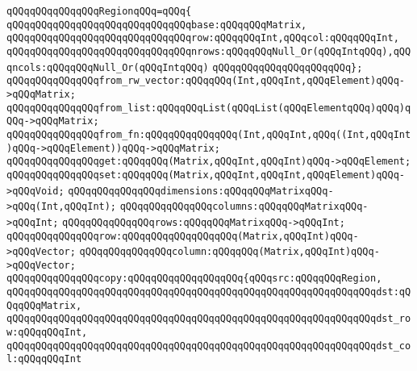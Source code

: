 \verb|qQQqqQQqqQQqqQQqRegionqQQq=qQQq{|\newline
\verb|qQQqqQQqqQQqqQQqqQQqqQQqqQQqqQQqbase:qQQqqQQqMatrix,|\newline
\verb|qQQqqQQqqQQqqQQqqQQqqQQqqQQqqQQqrow:qQQqqQQqInt,qQQqcol:qQQqqQQqInt,|\newline
\verb|qQQqqQQqqQQqqQQqqQQqqQQqqQQqqQQqnrows:qQQqqQQqNull_Or(qQQqIntqQQq),qQQqncols:qQQqqQQqNull_Or(qQQqIntqQQq)|\newline
\verb|qQQqqQQqqQQqqQQqqQQqqQQq};|\newline
\newline
\verb|qQQqqQQqqQQqqQQqfrom_rw_vector:qQQqqQQq(Int,qQQqInt,qQQqElement)qQQq->qQQqMatrix;|\newline
\verb|qQQqqQQqqQQqqQQqfrom_list:qQQqqQQqList(qQQqList(qQQqElementqQQq)qQQq)qQQq->qQQqMatrix;|\newline
\verb|qQQqqQQqqQQqqQQqfrom_fn:qQQqqQQqqQQqqQQq(Int,qQQqInt,qQQq((Int,qQQqInt)qQQq->qQQqElement))qQQq->qQQqMatrix;|\newline
\newline
\verb|qQQqqQQqqQQqqQQqget:qQQqqQQq(Matrix,qQQqInt,qQQqInt)qQQq->qQQqElement;|\newline
\verb|qQQqqQQqqQQqqQQqset:qQQqqQQq(Matrix,qQQqInt,qQQqInt,qQQqElement)qQQq->qQQqVoid;|\newline
\newline
\verb|qQQqqQQqqQQqqQQqdimensions:qQQqqQQqMatrixqQQq->qQQq(Int,qQQqInt);|\newline
\newline
\verb|qQQqqQQqqQQqqQQqcolumns:qQQqqQQqMatrixqQQq->qQQqInt;|\newline
\verb|qQQqqQQqqQQqqQQqrows:qQQqqQQqMatrixqQQq->qQQqInt;|\newline
\newline
\verb|qQQqqQQqqQQqqQQqrow:qQQqqQQqqQQqqQQqqQQq(Matrix,qQQqInt)qQQq->qQQqVector;|\newline
\verb|qQQqqQQqqQQqqQQqcolumn:qQQqqQQq(Matrix,qQQqInt)qQQq->qQQqVector;|\newline
\newline
\verb|qQQqqQQqqQQqqQQqcopy:qQQqqQQqqQQqqQQqqQQq{qQQqsrc:qQQqqQQqRegion,|\newline
\verb|qQQqqQQqqQQqqQQqqQQqqQQqqQQqqQQqqQQqqQQqqQQqqQQqqQQqqQQqqQQqqQQqdst:qQQqqQQqMatrix,|\newline
\verb|qQQqqQQqqQQqqQQqqQQqqQQqqQQqqQQqqQQqqQQqqQQqqQQqqQQqqQQqqQQqqQQqdst_row:qQQqqQQqInt,|\newline
\verb|qQQqqQQqqQQqqQQqqQQqqQQqqQQqqQQqqQQqqQQqqQQqqQQqqQQqqQQqqQQqqQQqdst_col:qQQqqQQqInt|\newline
